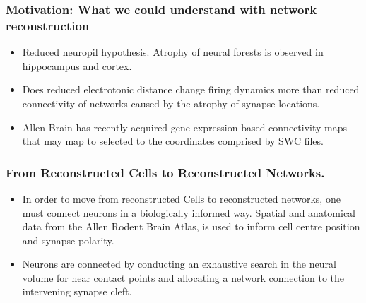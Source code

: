 \documentclass{beamer}
\begin{document}
\begin{frame}
\frametitle{Motivation: What we could understand with network reconstruction}%
\begin{itemize}

\vfill\item Reduced neuropil hypothesis. Atrophy of neural forests is observed in hippocampus and cortex.
\vfill\item Does reduced electrotonic distance change firing dynamics more than reduced connectivity of networks caused by the atrophy of synapse locations.
\vfill\item Allen Brain has recently acquired gene expression based connectivity maps that may map to selected to the coordinates comprised by SWC files.
\end{itemize}
\end{frame}

\begin{frame}
	\frametitle{From Reconstructed Cells to Reconstructed Networks.}

	\begin{itemize}
		\vfill \item In order to move from reconstructed Cells to reconstructed networks, one must connect neurons in a biologically informed way. Spatial and anatomical data from the Allen Rodent Brain Atlas, is used to inform cell centre position and synapse polarity.
		
		\vfill \item Neurons are connected by conducting an exhaustive search in the neural volume for near contact points and allocating a network connection to the intervening synapse cleft.
		
	\end{itemize}
\end{frame}
\end{document}
